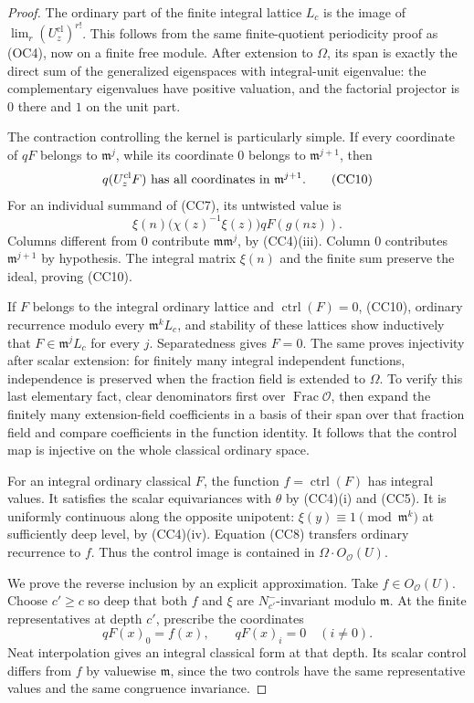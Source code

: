 \begin{proof}
The ordinary part of the finite integral lattice \(L_c\) is the
image of \(\lim_r(U_z^{\mathrm{cl}})^{r!}\).
This follows from the same finite-quotient periodicity proof as
(OC4), now on a finite free module.
After extension to \(\Omega\), its span is exactly the direct sum
of the generalized eigenspaces with integral-unit eigenvalue:
the complementary eigenvalues have positive valuation, and the
factorial projector is \(0\) there and \(1\) on the unit part.

The contraction controlling the kernel is particularly simple.
If every coordinate of \(qF\) belongs to \(\mathfrak m^j\), while
its coordinate \(0\) belongs to \(\mathfrak m^{j+1}\), then
\[
 q(U_z^{\mathrm{cl}}F)\ \hbox{has all coordinates in }
                   \mathfrak m^{j+1}.
 \tag{CC10}
\]
For an individual summand of (CC7), its untwisted value is
\[
 \xi(n)\bigl(\chi(z)^{-1}\xi(z)\bigr)
                 qF(g(nz)).
\]
Columns different from \(0\) contribute
\(\mathfrak m\mathfrak m^j\), by (CC4)(iii).
Column \(0\) contributes \(\mathfrak m^{j+1}\) by hypothesis.
The integral matrix \(\xi(n)\) and the finite sum preserve the
ideal, proving (CC10).

If \(F\) belongs to the integral ordinary lattice and
\(\operatorname{ctrl}(F)=0\), (CC10), ordinary recurrence modulo
every \(\mathfrak m^kL_c\), and stability of these lattices show
inductively that \(F\in\mathfrak m^jL_c\) for every \(j\).
Separatedness gives \(F=0\).
The same proves injectivity after scalar extension: for finitely
many integral independent functions, independence is preserved
when the fraction field is extended to \(\Omega\).
To verify this last elementary fact, clear denominators first over
\(\operatorname{Frac}\mathcal O\), then expand the finitely many
extension-field coefficients in a basis of their span over that
fraction field and compare coefficients in the function identity.
It follows that the control map is injective on the whole classical
ordinary space.

For an integral ordinary classical \(F\), the function
\(f=\operatorname{ctrl}(F)\) has integral values.
It satisfies the scalar equivariances with \(\theta\) by
(CC4)(i) and (CC5).
It is uniformly continuous along the opposite unipotent:
\(\xi(y)\equiv1\pmod{\mathfrak m^k}\) at sufficiently deep level,
by (CC4)(iv).
Equation (CC8) transfers ordinary recurrence to \(f\).
Thus the control image is contained in \(\Omega\cdot O_{\mathcal O}(U)\).

We prove the reverse inclusion by an explicit approximation.
Take \(f\in O_{\mathcal O}(U)\).
Choose \(c'\geq c\) so deep that both \(f\) and \(\xi\) are
\(N^-_{c'}\)-invariant modulo \(\mathfrak m\).
At the finite representatives at depth \(c'\), prescribe the
coordinates
\[
 qF(x)_0=f(x),\qquad qF(x)_i=0\quad(i\ne0).
\]
Neat interpolation gives an integral classical form at that depth.
Its scalar control differs from \(f\) by valuewise
\(\mathfrak m\), since the two controls have the same
representative values and the same congruence invariance.


\end{proof}
